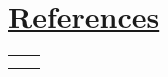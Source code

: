 \section{\underline{References}}
\begin{tabular}{ll}
	\berno & \mira\\
	\johannes & \ashish
\end{tabular}